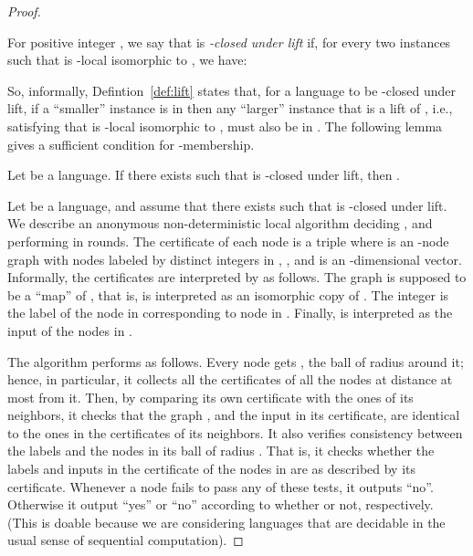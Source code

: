 \documentclass{llncs}
\newenvironment{proofofclaim}{\noindent {\em Proof.}}{\hfill  \medbreak}
\begin{document}
\begin{proof}
\begin{definition}
\label{def:lift}
For positive integer , we say that  is \emph{-closed under lift }if, for every two instances  such that  is -local isomorphic to , we have: 
\end{definition}

So, informally, Defintion~\ref{def:lift} states that, for a language  to be -closed under lift, if a ``smaller''  instance  is in  then any ``larger'' instance  that is a lift of , i.e., satisfying that  is -local isomorphic to , must also be in . The following lemma gives a sufficient condition for -membership. 

\begin{lemma}\label{claim:sufficient} 
Let  be a language. If there exists  such that  is -closed under lift, then . 
\end{lemma} 

\begin{proofofclaim}
Let  be a language, and assume that there exists  such that  is -closed under lift. We describe an anonymous non-deterministic local algorithm  deciding ,  and performing in  rounds. The certificate of each node  is a triple  where  is an -node graph with nodes labeled by distinct integers in , , and  is an -dimensional vector.
Informally, the certificates are interpreted by  as follows. The graph  is supposed to be a ``map'' of , that is,  is interpreted as an isomorphic copy of . The integer  is the label of the node in  corresponding to node  in . Finally,  is interpreted as the input of the nodes in . 

The algorithm  performs as follows. Every node  gets , the ball of radius  around it; hence, in particular, it collects all the certificates of all the nodes at distance at most  from it. Then, by comparing its own certificate with the ones of its neighbors,  it checks that the graph , and the input  in its certificate, are identical to the ones in the certificates of its neighbors. It also verifies consistency between the labels and the nodes in its ball of radius . That is, it checks whether the labels and inputs in the certificate of the nodes in  are as described by its  certificate. Whenever a node fails to pass any of these tests, it outputs ``no''. Otherwise it output ``yes'' or ``no'' according to whether  or not, respectively. (This is doable because we are considering languages that are decidable in the usual sense of sequential computation). 


\end{proofofclaim}
\end{proof}
\end{document}
